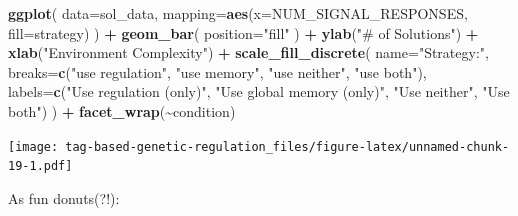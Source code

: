 \documentclass[
]{book}
\newenvironment{Shaded}{\begin{snugshade}}{\end{snugshade}}
\newcommand{\DataTypeTok}[1]{\textcolor[rgb]{0.13,0.29,0.53}{#1}}
\newcommand{\KeywordTok}[1]{\textcolor[rgb]{0.13,0.29,0.53}{\textbf{#1}}}
\newcommand{\NormalTok}[1]{#1}
\newcommand{\OperatorTok}[1]{\textcolor[rgb]{0.81,0.36,0.00}{\textbf{#1}}}
\newcommand{\StringTok}[1]{\textcolor[rgb]{0.31,0.60,0.02}{#1}}
\begin{document}
\begin{Shaded}
\begin{Highlighting}[]
\KeywordTok{ggplot}\NormalTok{( }\DataTypeTok{data=}\NormalTok{sol\_data, }\DataTypeTok{mapping=}\KeywordTok{aes}\NormalTok{(}\DataTypeTok{x=}\NormalTok{NUM\_SIGNAL\_RESPONSES, }\DataTypeTok{fill=}\NormalTok{strategy) ) }\OperatorTok{+}
\StringTok{  }\KeywordTok{geom\_bar}\NormalTok{(}
    \DataTypeTok{position=}\StringTok{"fill"}
\NormalTok{  ) }\OperatorTok{+}
\StringTok{  }\KeywordTok{ylab}\NormalTok{(}\StringTok{"\# of Solutions"}\NormalTok{) }\OperatorTok{+}
\StringTok{  }\KeywordTok{xlab}\NormalTok{(}\StringTok{"Environment Complexity"}\NormalTok{) }\OperatorTok{+}
\StringTok{  }\KeywordTok{scale\_fill\_discrete}\NormalTok{(}
    \DataTypeTok{name=}\StringTok{"Strategy:"}\NormalTok{,}
    \DataTypeTok{breaks=}\KeywordTok{c}\NormalTok{(}\StringTok{"use regulation"}\NormalTok{,}
             \StringTok{"use memory"}\NormalTok{,}
             \StringTok{"use neither"}\NormalTok{,}
             \StringTok{"use both"}\NormalTok{),}
    \DataTypeTok{labels=}\KeywordTok{c}\NormalTok{(}\StringTok{"Use regulation (only)"}\NormalTok{,}
             \StringTok{"Use global memory (only)"}\NormalTok{,}
             \StringTok{"Use neither"}\NormalTok{,}
             \StringTok{"Use both"}\NormalTok{)}
\NormalTok{    ) }\OperatorTok{+}
\StringTok{  }\KeywordTok{facet\_wrap}\NormalTok{(}\OperatorTok{\textasciitilde{}}\NormalTok{condition)}
\end{Highlighting}
\end{Shaded}

\texttt{[image: tag-based-genetic-regulation\_files/figure-latex/unnamed-chunk-19-1.pdf]}

As fun donuts(?!):
\end{document}
